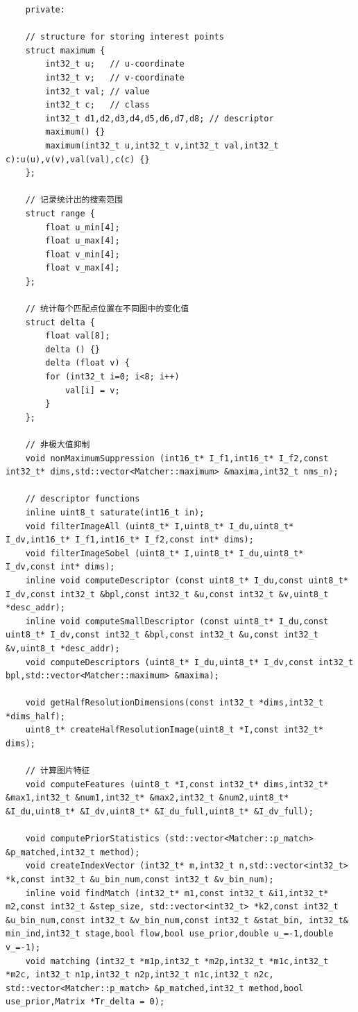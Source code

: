 \documentclass[UTF8]{ctexart}
\begin{document}
\begin{verbatim}
    private:

    // structure for storing interest points
    struct maximum {
        int32_t u;   // u-coordinate
        int32_t v;   // v-coordinate
        int32_t val; // value
        int32_t c;   // class
        int32_t d1,d2,d3,d4,d5,d6,d7,d8; // descriptor
        maximum() {}
        maximum(int32_t u,int32_t v,int32_t val,int32_t c):u(u),v(v),val(val),c(c) {}
    };
    
    // 记录统计出的搜索范围
    struct range {
        float u_min[4];
        float u_max[4];
        float v_min[4];
        float v_max[4];
    };
    
    // 统计每个匹配点位置在不同图中的变化值
    struct delta {
        float val[8];
        delta () {}
        delta (float v) {
        for (int32_t i=0; i<8; i++)
            val[i] = v;
        }
    };
    
    // 非极大值抑制
    void nonMaximumSuppression (int16_t* I_f1,int16_t* I_f2,const int32_t* dims,std::vector<Matcher::maximum> &maxima,int32_t nms_n);

    // descriptor functions
    inline uint8_t saturate(int16_t in);
    void filterImageAll (uint8_t* I,uint8_t* I_du,uint8_t* I_dv,int16_t* I_f1,int16_t* I_f2,const int* dims);
    void filterImageSobel (uint8_t* I,uint8_t* I_du,uint8_t* I_dv,const int* dims);
    inline void computeDescriptor (const uint8_t* I_du,const uint8_t* I_dv,const int32_t &bpl,const int32_t &u,const int32_t &v,uint8_t *desc_addr);
    inline void computeSmallDescriptor (const uint8_t* I_du,const uint8_t* I_dv,const int32_t &bpl,const int32_t &u,const int32_t &v,uint8_t *desc_addr);
    void computeDescriptors (uint8_t* I_du,uint8_t* I_dv,const int32_t bpl,std::vector<Matcher::maximum> &maxima);
    
    void getHalfResolutionDimensions(const int32_t *dims,int32_t *dims_half);
    uint8_t* createHalfResolutionImage(uint8_t *I,const int32_t* dims);

    // 计算图片特征
    void computeFeatures (uint8_t *I,const int32_t* dims,int32_t* &max1,int32_t &num1,int32_t* &max2,int32_t &num2,uint8_t* &I_du,uint8_t* &I_dv,uint8_t* &I_du_full,uint8_t* &I_dv_full);

    void computePriorStatistics (std::vector<Matcher::p_match> &p_matched,int32_t method);
    void createIndexVector (int32_t* m,int32_t n,std::vector<int32_t> *k,const int32_t &u_bin_num,const int32_t &v_bin_num);
    inline void findMatch (int32_t* m1,const int32_t &i1,int32_t* m2,const int32_t &step_size, std::vector<int32_t> *k2,const int32_t &u_bin_num,const int32_t &v_bin_num,const int32_t &stat_bin, int32_t& min_ind,int32_t stage,bool flow,bool use_prior,double u_=-1,double v_=-1);
    void matching (int32_t *m1p,int32_t *m2p,int32_t *m1c,int32_t *m2c, int32_t n1p,int32_t n2p,int32_t n1c,int32_t n2c, std::vector<Matcher::p_match> &p_matched,int32_t method,bool use_prior,Matrix *Tr_delta = 0);


\end{verbatim}
\end{document}
